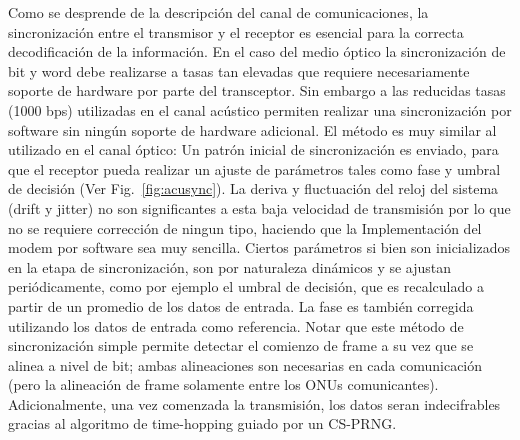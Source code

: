 Como se desprende de la descripción del canal de comunicaciones, la sincronización entre el transmisor y el receptor es esencial para la correcta decodificación de la información. 
En el caso del medio óptico la sincronización de bit y word debe realizarse a tasas tan elevadas que requiere necesariamente soporte de hardware por parte del transceptor.
Sin embargo a las reducidas tasas (1000 bps) utilizadas en el canal acústico permiten realizar una sincronización por software sin ningún soporte de hardware adicional. 
El método es muy similar al utilizado en el canal óptico: Un patrón inicial de sincronización es enviado, para que el receptor pueda realizar un ajuste de parámetros tales como fase y umbral de decisión (Ver Fig.~\ref{fig:acusync}). La deriva y fluctuación del reloj del sistema (drift y jitter) no son significantes a esta baja velocidad de transmisión por lo que no se requiere corrección de ningun tipo, haciendo que la Implementación del modem por software sea muy sencilla.
Ciertos parámetros si bien son inicializados en la etapa de sincronización, son por naturaleza dinámicos y se ajustan periódicamente, como por ejemplo el umbral de decisión, que es recalculado a partir de un promedio de los datos de entrada. La fase es también corregida utilizando los datos de entrada como referencia. Notar que este método de sincronización simple permite detectar el comienzo de frame a su vez que se alinea a nivel de bit; ambas alineaciones son necesarias en cada comunicación (pero la alineación de frame solamente entre los ONUs comunicantes). Adicionalmente, una vez comenzada la transmisión, los datos seran indecifrables gracias al algoritmo de time-hopping guiado por un CS-PRNG.



